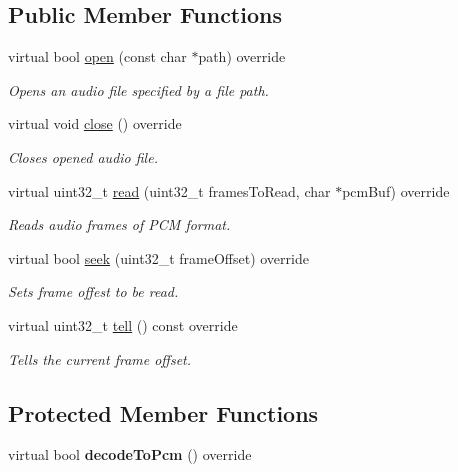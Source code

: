 \subsection*{Public Member Functions}
\begin{DoxyCompactItemize}
\item 
virtual bool \hyperlink{classcocos2d_1_1experimental_1_1AudioDecoderMp3_adb47b02e2c9774cb069f393c5a63608a}{open} (const char $\ast$path) override
\begin{DoxyCompactList}\small\item\em Opens an audio file specified by a file path. \end{DoxyCompactList}\item 
virtual void \hyperlink{classcocos2d_1_1experimental_1_1AudioDecoderMp3_a547b08590805b5f5443e8ba485e271b2}{close} () override
\begin{DoxyCompactList}\small\item\em Closes opened audio file. \end{DoxyCompactList}\item 
virtual uint32\+\_\+t \hyperlink{classcocos2d_1_1experimental_1_1AudioDecoderMp3_a9b033167139ff6d094fe27d79a2b78ad}{read} (uint32\+\_\+t frames\+To\+Read, char $\ast$pcm\+Buf) override
\begin{DoxyCompactList}\small\item\em Reads audio frames of P\+CM format. \end{DoxyCompactList}\item 
virtual bool \hyperlink{classcocos2d_1_1experimental_1_1AudioDecoderMp3_a997804dcef5a632730f0efea296374f2}{seek} (uint32\+\_\+t frame\+Offset) override
\begin{DoxyCompactList}\small\item\em Sets frame offest to be read. \end{DoxyCompactList}\item 
virtual uint32\+\_\+t \hyperlink{classcocos2d_1_1experimental_1_1AudioDecoderMp3_adf8e9914377f0cca2fa45a5741bb20bf}{tell} () const override
\begin{DoxyCompactList}\small\item\em Tells the current frame offset. \end{DoxyCompactList}\end{DoxyCompactItemize}
\subsection*{Protected Member Functions}
\begin{DoxyCompactItemize}
\item 
\mbox{\label{classcocos2d_1_1experimental_1_1AudioDecoderMp3_aa1465d75c371209b438771118cbb620e}} 
virtual bool {\bfseries decode\+To\+Pcm} () override
\end{DoxyCompactItemize}
